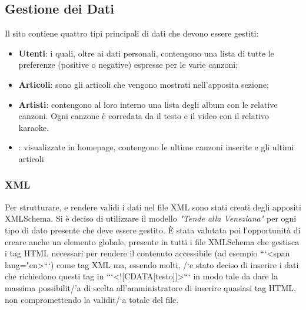 \subsection{Gestione dei Dati}
Il sito contiene quattro tipi principali di dati che devono essere gestiti:
\begin{itemize}
    \item \textbf{Utenti}: i quali, oltre ai dati personali, contengono una lista di tutte le preferenze (positive o negative) espresse per le varie canzoni;
    \item \textbf{Articoli}: sono gli articoli che vengono mostrati nell'apposita sezione;
    \item \textbf{Artisti}: contengono al loro interno una lista degli album con le relative canzoni. Ogni canzone \`e corredata da il testo e il video con il relativo karaoke.
    \item {}: visualizzate in homepage, contengono le ultime canzoni inserite e gli ultimi articoli
\end{itemize}

\subsubsection{XML}

Per strutturare, e rendere validi i dati nel file XML sono stati creati degli appositi XMLSchema.
Si \`e deciso di utilizzare il modello \textit{"Tende alla Veneziana"} per ogni tipo di dato presente che deve essere gestito.
\`E stata valutata poi l'opportunit\`a di creare anche un elemento globale, presente in tutti i file XMLSchema che gestisca i tag HTML necessari per rendere il contenuto accessibile (ad esempio ```<span lang="en>```) come tag XML ma, essendo molti, /`e stato deciso di inserire i dati che richiedono questi tag in ```<![CDATA[testo]]>``` in modo tale da dare la massima possibilit/'a di scelta all'amministratore di inserire quasiasi tag HTML, non compromettendo la validit/`a totale del file.

